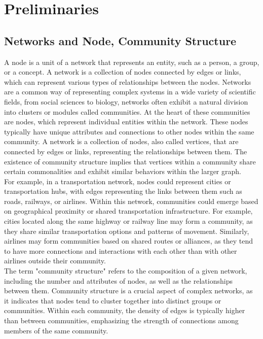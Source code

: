 \section{Preliminaries}
\subsection{Networks and Node, Community Structure}
A node is a unit of a network that represents an entity, such as a person, a group, or a concept. A network is a collection of nodes connected by edges or links, which can represent various types of relationships between the nodes. Networks are a common way of representing complex systems in a wide variety of scientific fields, from social sciences to biology, networks often exhibit a natural division into clusters or modules called communities. At the heart of these communities are nodes, which represent individual entities within the network. These nodes typically have unique attributes and connections to other nodes within the same community. A network is a collection of nodes, also called vertices, that are connected by edges or links, representing the relationships between them. The existence of community structure implies that vertices within a community share certain commonalities and exhibit similar behaviors within the larger graph. \\

For example, in a transportation network, nodes could represent cities or transportation hubs, with edges representing the links between them such as roads, railways, or airlines. Within this network, communities could emerge based on geographical proximity or shared transportation infrastructure. For example, cities located along the same highway or railway line may form a community, as they share similar transportation options and patterns of movement. Similarly, airlines may form communities based on shared routes or alliances, as they tend to have more connections and interactions with each other than with other airlines outside their community. \\

The term "community structure" refers to the composition of a given network, including the number and attributes of nodes, as well as the relationships between them. Community structure is a crucial aspect of complex networks, as it indicates that nodes tend to cluster together into distinct groups or communities. Within each community, the density of edges is typically higher than between communities, emphasizing the strength of connections among members of the same community.\\ 

